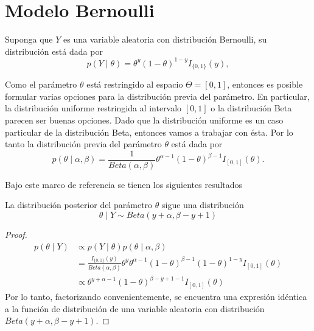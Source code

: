 \documentclass[10pt,openright]{book}\usepackage[]{graphicx}\usepackage[]{color}
\begin{document}
\section{Modelo Bernoulli}
    
Suponga que $Y$ es una variable aleatoria con distribuci\'on Bernoulli, su distribuci\'on est\'a dada por
    \begin{equation}
    p(Y \mid \theta)=\theta^y(1-\theta)^{1-y}I_{\{0,1\}}(y),
    \end{equation}
    
    Como el par\'ametro $\theta$ est\'a restringido al espacio $\Theta=[0,1]$, entonces es posible formular varias opciones para la distribuci\'on previa del par\'ametro. En particular, la distribuci\'on uniforme restringida al intervalo $[0,1]$ o la distribuci\'on Beta parecen ser buenas opciones. Dado que la distribuci\'on uniforme es un caso particular de la distribuci\'on Beta, entonces vamos a trabajar con \'esta. Por lo tanto la distribuci\'on previa del par\'ametro $\theta$ est\'a dada por
    \begin{equation}\label{beta_distribution}
    p(\theta \mid \alpha,\beta)=\frac{1}{Beta(\alpha,\beta)}\theta^{\alpha-1}(1-\theta)^{\beta-1}I_{[0,1]}(\theta).
    \end{equation}
    
    
    Bajo este marco de referencia se tienen los siguientes resultados
    \begin{Res}
    La distribuci\'on posterior del par\'ametro $\theta$ sigue una distribuci\'on
    \begin{equation*}
    \theta \mid Y \sim Beta(y+\alpha,\beta-y+1)
    \end{equation*}
    \end{Res}
    
    \begin{proof}
    \begin{align*}
    p(\theta \mid Y)&\propto p(Y \mid \theta)p(\theta \mid \alpha,\beta)\\
    &=\frac{I_{\{0,1\}}(y)}{Beta(\alpha,\beta)}\theta^y\theta^{\alpha-1}(1-\theta)^{\beta-1}(1-\theta)^{1-y}I_{[0,1]}(\theta)\\
    &\propto \theta^{y+\alpha-1}(1-\theta)^{\beta-y+1-1}I_{[0,1]}(\theta)
    \end{align*}
    Por lo tanto, factorizando convenientemente, se encuentra una expresi\'on id\'entica a la funci\'on de distribuci\'on de una variable aleatoria con distribuci\'on $Beta(y+\alpha,\beta-y+1)$.
    \end{proof}
    
\end{document}
